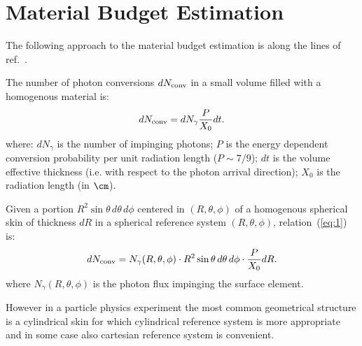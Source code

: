 \section{Material Budget Estimation}
\label{correctionFactors}

The following approach to the material budget estimation is along the lines of ref.~\cite{steve}. 

The number of photon conversions $dN_{\rm conv}$ in a
small volume filled with a homogenous material is:
\begin{equation}
dN_{\rm conv} = dN_{\gamma} \frac{P}{X_0} dt .
\label{eq:1}
\end{equation}
where: $dN_\gamma$ is the number of impinging photons; $P$ is the energy dependent conversion probability per unit
radiation length ($P\sim 7/9$); $dt$ is the volume effective thickness (i.e. with respect to the photon arrival direction); $X_0$ is the radiation length (in $\cm$).

Given a portion $R^2 \sin \theta\, d\theta\, d\phi$ centered in $(R,\theta,\phi)$ of a homogenous spherical skin of 
thickness $dR$ in a spherical reference system $(R, \theta, \phi)$,
relation~(\ref{eq:1}) is:
\begin{equation}
dN_{\rm conv} = N_{\gamma}(R, \theta, \phi) \cdot R^2 \sin \theta \, d\theta\, d\phi \cdot \frac{P}{X_0} dR .
\label{eq:2}
\end{equation}
where $N_\gamma(R,\theta,\phi)$ is the photon flux impinging the surface element.

However in a particle physics experiment the most common geometrical
structure is a cylindrical skin for which cylindrical reference system
is more appropriate and in some case also cartesian reference system
is convenient.

